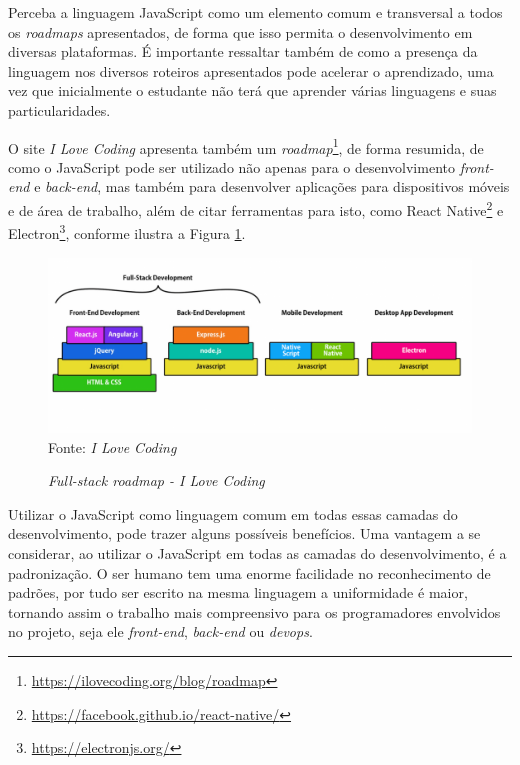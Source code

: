 \documentclass[
	12pt,				%
	openright,			%
	twoside,			%
	a4paper,			%
	english,			%
	brazil				%
	]{abntex2}
\begin{document}
Perceba a linguagem JavaScript como um elemento comum e transversal a todos os \textit{roadmaps} apresentados, de forma que isso permita o desenvolvimento em diversas plataformas. É importante ressaltar também de como a presença da linguagem nos diversos roteiros apresentados pode acelerar o aprendizado, uma vez que inicialmente o estudante não terá que aprender várias linguagens e suas particularidades. 

O site \textit{I Love Coding} apresenta também um \textit{roadmap}\footnote{\url{https://ilovecoding.org/blog/roadmap}}, de forma resumida, de como o JavaScript pode ser utilizado não apenas para o desenvolvimento \textit{front-end} e \textit{back-end}, mas também para desenvolver aplicações para dispositivos móveis e de área de trabalho, além de citar ferramentas para isto, como React Native\footnote{\url{https://facebook.github.io/react-native/}} e Electron\footnote{\url{https://electronjs.org/}}, conforme ilustra a Figura \ref{fig:IlovecodingRoadmap}.

\begin{figure}[h!]
	\centering

	\caption{\textit{Full-stack roadmap - I Love Coding}} \label{fig:IlovecodingRoadmap}
    \includegraphics[scale=0.4]{ilovecoding-roadmap} \\
    Fonte: {\textit{I Love Coding}}

\end{figure}

Utilizar o JavaScript como linguagem comum em todas essas camadas do desenvolvimento, pode trazer alguns possíveis benefícios. Uma vantagem a se considerar, ao utilizar o JavaScript em todas as camadas do desenvolvimento, é a padronização. O ser humano tem uma enorme facilidade no reconhecimento de padrões, por tudo ser escrito na mesma linguagem a uniformidade é maior, tornando assim o trabalho mais compreensivo para os programadores envolvidos no projeto, seja ele \textit{front-end}, \textit{back-end} ou \textit{devops}. 
\end{document}
